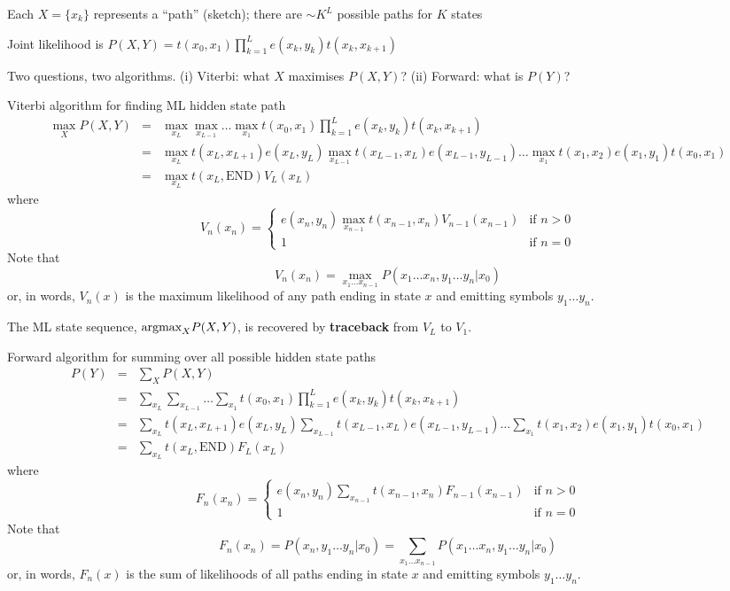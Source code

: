 \documentclass{beamer}
\begin{document}
\begin{frame}{}
  \item Each $X=\{x_k\}$ represents a ``path'' (sketch); there are $\sim K^L$ possible paths for $K$ states
  \iteme
 \item Joint likelihood is $P(X,Y) = t(x_0,x_1) \prod_{k=1}^L e(x_k,y_k) t(x_k,x_{k+1})$
 \iteme
\item Two questions, two algorithms. (i) Viterbi: what $X$ maximises $P(X,Y)$? (ii) Forward: what is $P(Y)$?
\item Viterbi algorithm for finding ML hidden state path
\begin{eqnarray*}
\max_X P(X,Y) & = & \max_{x_L} \max_{x_{L-1}} \ldots \max_{x_1} t(x_0,x_1) \prod_{k=1}^L e(x_k,y_k) t(x_k,x_{k+1}) \\
& = & \max_{x_L} t(x_L,x_{L+1}) e(x_L,y_L) \max_{x_{L-1}} t(x_{L-1},x_L) e(x_{L-1},y_{L-1}) \ldots \max_{x_1} t(x_1,x_2) e(x_1,y_1) t(x_0,x_1) \\
& = & \max_{x_L} t(x_L,\mbox{END}) V_L(x_L)
\end{eqnarray*}
where
\[
V_n(x_n) = \left\{ \begin{array}{ll} \displaystyle
e(x_n,y_n) \max_{x_{n-1}} t(x_{n-1},x_n) V_{n-1}(x_{n-1}) & \mbox{if $n > 0$} \\
1 & \mbox{if $n=0$}
\end{array} \right.
\]
Note that
\[
V_n(x_n) = \max_{x_1 \ldots x_{n-1}} P(x_1 \ldots x_n, y_1 \ldots y_n | x_0)
\]
or, in words, $V_n(x)$ is the maximum likelihood of any path ending in state $x$ and emitting symbols $y_1 \ldots y_n$.

The ML state sequence, $\mbox{argmax}_X P(X,Y)$, is recovered by {\bf traceback} from $V_L$ to $V_1$.
\item Forward algorithm for summing over all possible hidden state paths
\begin{eqnarray*}
P(Y) & = & \sum_X P(X,Y) \\
& = & \sum_{x_L} \sum_{x_{L-1}} \ldots \sum_{x_1} t(x_0,x_1) \prod_{k=1}^L e(x_k,y_k) t(x_k,x_{k+1}) \\
& = & \sum_{x_L} t(x_L,x_{L+1}) e(x_L,y_L) \sum_{x_{L-1}} t(x_{L-1},x_L) e(x_{L-1},y_{L-1}) \ldots \sum_{x_1} t(x_1,x_2) e(x_1,y_1) t(x_0,x_1) \\
& = & \sum_{x_L} t(x_L,\mbox{END}) F_L(x_L)
\end{eqnarray*}
where
\[
F_n(x_n) = \left\{ \begin{array}{ll} \displaystyle
e(x_n,y_n) \sum_{x_{n-1}} t(x_{n-1},x_n) F_{n-1}(x_{n-1}) & \mbox{if $n > 0$} \\
1 & \mbox{if $n=0$}
\end{array} \right.
\]
Note that
\[
F_n(x_n) = P(x_n, y_1 \ldots y_n | x_0) = \sum_{x_1 \ldots x_{n-1}} P(x_1 \ldots x_n, y_1 \ldots y_n | x_0)
\]
or, in words, $F_n(x)$ is the sum of likelihoods of all paths ending in state $x$ and emitting symbols $y_1 \ldots y_n$.


\end{frame}
\end{document}
